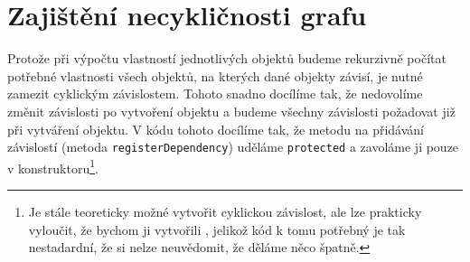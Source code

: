\section[Necykličnost]{Zajištění necykličnosti grafu}
\label{sec:acyclicity}

Protože při výpočtu vlastností jednotlivých objektů budeme rekurzivně počítat potřebné vlastnosti všech objektů, na kterých dané objekty závisí, je nutné zamezit cyklickým závislostem.
Tohoto snadno docílíme tak, že nedovolíme změnit závislosti po vytvoření objektu a budeme všechny závislosti požadovat již při vytváření objektu.
V kódu tohoto docílíme tak, že metodu na přidávání závislostí (metoda \texttt{registerDependency}\cite[line 20-23]{geometryjs:source:geometryObjects:dependencyNode.ts}) uděláme \texttt{protected} a zavoláme ji pouze v konstruktoru\footnote{Je stále teoreticky možné vytvořit cyklickou závislost, ale lze prakticky vyloučit, že bychom ji vytvořili , jelikož kód k tomu potřebný je tak nestadardní, že si nelze neuvědomit, že děláme něco špatně.}.